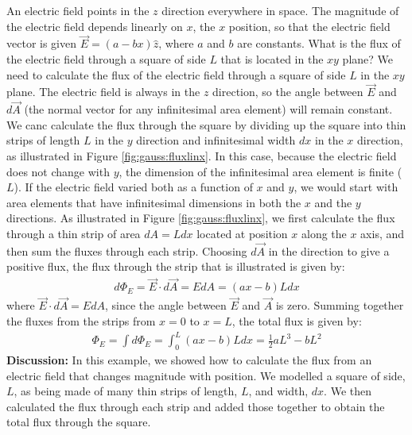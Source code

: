 \begin{example}{An electric field points in the $z$ direction everywhere in space. The magnitude of the electric field depends linearly on $x$, the $x$ position, so that the electric field vector is given $\vec E=(a-bx)\hat z$, where $a$ and $b$ are constants. What is the flux of the electric field through a square of side $L$ that is located in the $xy$ plane?}
We need to calculate the flux of the electric field through a square of side $L$ in the $xy$ plane. The electric field is always in the $z$ direction, so the angle between $\vec E$ and $d\vec A$ (the normal vector for any infinitesimal area element) will remain constant. We canc calculate the flux through the square by dividing up the square into thin strips of length $L$ in the $y$ direction and infinitesimal width $dx$ in the $x$ direction, as illustrated in Figure \ref{fig:gauss:fluxlinx}. In this case, because the electric field does not change with $y$, the dimension of the infinitesimal area element is finite ($L$). If the electric field varied both as a function of $x$ and $y$, we would start with area elements that have infinitesimal dimensions in both the $x$ and the $y$ directions. 
As illustrated in Figure \ref{fig:gauss:fluxlinx}, we first calculate the flux through a thin strip of area $dA=Ldx$ located at position $x$ along the $x$ axis, and then sum the fluxes through each strip. Choosing $d\vec A$ in the direction to give a positive flux, the flux through the strip that is illustrated is given by:
\begin{align*}
d\Phi_E=\vec E\cdot d\vec A=EdA=(ax-b)Ldx
\end{align*}
where $\vec E\cdot d\vec A=EdA$, since the angle between $\vec E$ and $\vec A$ is zero. Summing together the fluxes from the strips from $x=0$ to $x=L$, the total flux is given by:
\begin{align*}
\Phi_E=\int d\Phi_E=\int_0^L(ax-b)Ldx=\frac{1}{2}aL^3-bL^2
\end{align*}
\textbf{Discussion:} In this example, we showed how to calculate the flux from an electric field that changes magnitude with position. We modelled a square of side, $L$, as being made of many thin strips of length, $L$, and width, $dx$. We then calculated the flux through each strip and added those together to obtain the total flux through the square.
\end{example}

